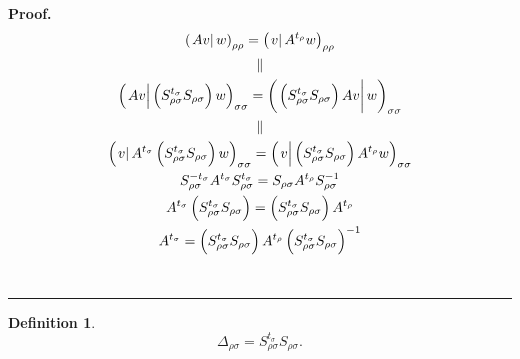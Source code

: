 \documentclass[aps,preprint]{revtex4}
\newtheorem{definition}[theorem]{Definition}
\newenvironment{proof}[1][Proof]{\noindent\textbf{#1.} }{\ \rule{0.5em}{0.5em}}
\begin{document}
\bigskip

\begin{proof}
\begin{gather}
\left( \left. Av\right\vert w\right) _{\rho \rho }=\left( \left.
v\right\vert A^{t_{\rho }}w\right) _{\rho \rho } \\
\parallel \\
\left( \left. \overset{}{Av}\right\vert \left( \overset{}{S_{\rho \sigma
}^{t_{\sigma }}S_{\rho \sigma }}\right) w\right) _{\sigma \sigma }=\left(
\left. \overset{}{\left( \overset{}{S_{\rho \sigma }^{t_{\sigma }}S_{\rho
\sigma }}\right) Av}\right\vert w\right) _{\sigma \sigma } \\
\parallel \\
\left( \left. \overset{}{v}\right\vert A^{t_{\sigma }}\left( \overset{}{%
S_{\rho \sigma }^{t_{\sigma }}S_{\rho \sigma }}\right) w\right) _{\sigma
\sigma }=\left( \left. \overset{\overset{}{}}{v}\right\vert \left( \overset{}%
{S_{\rho \sigma }^{t_{\sigma }}S_{\rho \sigma }}\right) A^{t_{\rho
}}w\right) _{\sigma \sigma } \\
S_{\rho \sigma }^{-t_{\sigma }}A^{t_{\sigma }}S_{\rho \sigma }^{t_{\sigma
}}=S_{\rho \sigma }A^{t_{\rho }}S_{\rho \sigma }^{-1} \\
A^{t_{\sigma }}\left( \overset{}{S_{\rho \sigma }^{t_{\sigma }}S_{\rho
\sigma }}\right) =\left( \overset{}{S_{\rho \sigma }^{t_{\sigma }}S_{\rho
\sigma }}\right) A^{t_{\rho }} \\
A^{t_{\sigma }}=\left( \overset{}{S_{\rho \sigma }^{t_{\sigma }}S_{\rho
\sigma }}\right) A^{t_{\rho }}\left( \overset{}{S_{\rho \sigma }^{t_{\sigma
}}S_{\rho \sigma }}\right) ^{-1}
\end{gather}
\end{proof}

\begin{definition}
\begin{equation}
\Delta _{\rho \sigma }=S_{\rho \sigma }^{t_{\sigma }}S_{\rho \sigma }.
\end{equation}
\end{definition}
\end{document}
